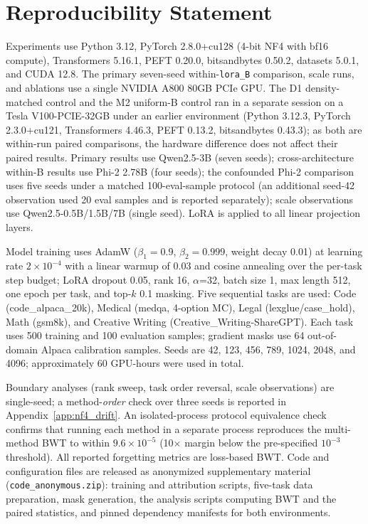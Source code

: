 \section*{Reproducibility Statement}

Experiments use Python 3.12, PyTorch 2.8.0+cu128 (4-bit NF4 with bf16 compute), Transformers 5.16.1, PEFT 0.20.0, bitsandbytes 0.50.2, datasets 5.0.1, and CUDA 12.8. The primary seven-seed within-\texttt{lora\_B} comparison, scale runs, and ablations use a single NVIDIA A800 80GB PCIe GPU. The D1 density-matched control and the M2 uniform-B control ran in a separate session on a Tesla V100-PCIE-32GB under an earlier environment (Python 3.12.3, PyTorch 2.3.0+cu121, Transformers 4.46.3, PEFT 0.13.2, bitsandbytes 0.43.3); as both are within-run paired comparisons, the hardware difference does not affect their paired results. Primary results use Qwen2.5-3B (seven seeds); cross-architecture within-B results use Phi-2 2.78B (four seeds); the confounded Phi-2 comparison uses five seeds under a matched 100-eval-sample protocol (an additional seed-42 observation used 20 eval samples and is reported separately); scale observations use Qwen2.5-0.5B/1.5B/7B (single seed). LoRA is applied to all linear projection layers.

Model training uses AdamW ($\beta_1{=}0.9$, $\beta_2{=}0.999$, weight decay 0.01) at learning rate $2\times10^{-4}$ with a linear warmup of 0.03 and cosine annealing over the per-task step budget; LoRA dropout 0.05, rank 16, $\alpha$=32, batch size 1, max length 512, one epoch per task, and top-$k$ 0.1 masking. Five sequential tasks are used: Code (code\_alpaca\_20k), Medical (medqa, 4-option MC), Legal (lexglue/case\_hold), Math (gsm8k), and Creative Writing (Creative\_Writing-ShareGPT). Each task uses 500 training and 100 evaluation samples; gradient masks use 64 out-of-domain Alpaca calibration samples. Seeds are 42, 123, 456, 789, 1024, 2048, and 4096; approximately 60 GPU-hours were used in total.

Boundary analyses (rank sweep, task order reversal, scale observations) are single-seed; a method-\emph{order} check over three seeds is reported in Appendix~\ref{app:nf4_drift}. An isolated-process protocol equivalence check confirms that running each method in a separate process reproduces the multi-method BWT to within $9.6 \times 10^{-5}$ (10$\times$ margin below the pre-specified $10^{-3}$ threshold). All reported forgetting metrics are loss-based BWT. Code and configuration files are released as anonymized supplementary material (\texttt{code\_anonymous.zip}): training and attribution scripts, five-task data preparation, mask generation, the analysis scripts computing BWT and the paired statistics, and pinned dependency manifests for both environments.

